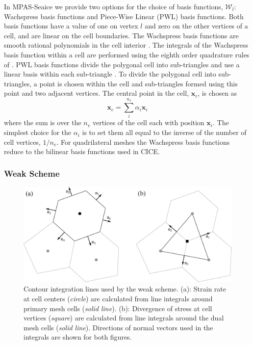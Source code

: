 In MPAS-Seaice we provide two options for the choice of basis functions, $\mathcal{W}_l$: Wachspress basis functions and Piece-Wise Linear (PWL) basis functions. Both basis functions have a value of one on vertex $l$ and zero on the other vertices of a cell, and are linear on the cell boundaries. The Wachspress basis functions are smooth rational polynomials in the cell interior \citep{Dasgupta03}. The integrals of the Wachspress basis function within a cell are performed using the eighth order quadrature rules of \citet{Dunavant85}. PWL basis functions divide the polygonal cell into sub-triangles and use a linear basis within each sub-triangle \citep{Bailey08}. To divide the polygonal cell into sub-triangles, a point is chosen within the cell and sub-triangles formed using this point and two adjacent vertices. The central point in the cell, $\mathbf{x}_c$,  is chosen as
\begin{equation}
\mathbf{x}_c = \sum_i^{n_v} \alpha_i \mathbf{x}_i
\end{equation}
where the sum is over the $n_v$ vertices of the cell each with position $\mathbf{x}_i$. The simplest choice for the $\alpha_i$ is to set them all equal to the inverse of the number of cell vertices, $1/n_v$. For quadrilateral meshes the Wachspress basis functions reduce to the bilinear basis functions used in CICE.

\subsubsection{Weak Scheme}

\begin{figure}[]
\centering
\includegraphics[width=\linewidth]{seaice/figures/mesh_weak.eps}
\caption{Contour integration lines used by the weak scheme. (a): Strain rate at cell centers (\emph{circle}) are calculated from line integrals around primary mesh cells (\emph{solid line}). (b): Divergence of stress at cell vertices (\emph{square}) are calculated from line integrals around the dual mesh cells (\emph{solid line}). Directions of normal vectors used in the integrals are shown for both figures.}
\label{fig:mesh_weak}
\end{figure}


